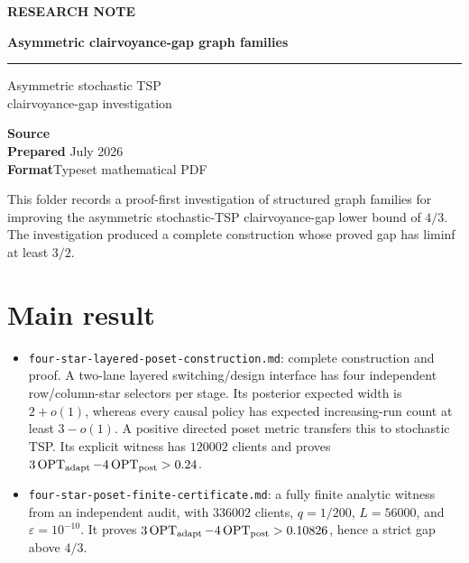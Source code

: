 \documentclass[11pt,a4paper]{article}
\begin{document}
\color{BodyGray}
\begin{titlepage}
  \thispagestyle{empty}
  \vspace*{22mm}
  {\sffamily\small\bfseries\color{Accent}\MakeUppercase{Research note}}\par
  \vspace{8mm}
  {\sffamily\fontsize{21}{25}\selectfont\bfseries\color{Navy} Asymmetric clairvoyance-gap graph families}\par
  \vspace{6mm}
  {\color{Accent}\rule{42mm}{1.4pt}}\par
  \vspace{11mm}
  {\Large\color{BodyGray} Asymmetric stochastic TSP\\
  clairvoyance-gap investigation}\par
  \vfill
  \begin{tcolorbox}[
    colback=SoftBlue,colframe=SoftBlue,arc=2pt,
    left=10pt,right=10pt,top=8pt,bottom=8pt]
    \sffamily
    \textbf{Source}\quad {}\\[3pt]
    \textbf{Prepared} July 2026\\[3pt]
    \textbf{Format}\quad Typeset mathematical PDF
  \end{tcolorbox}
  \vspace{12mm}
\end{titlepage}

This folder records a proof-first investigation of structured graph families for improving the asymmetric stochastic-TSP clairvoyance-gap lower bound of \(4/3\).  The investigation produced a complete construction whose proved gap has liminf at least \(3/2\).


\section*{Main result}

\begin{itemize}

\item \nolinkurl{four-star-layered-poset-construction.md}: complete construction and proof. A two-lane layered switching/design interface has four independent row/column-star selectors per stage.  Its posterior expected width is \(2+o(1)\), whereas every causal policy has expected increasing-run count at least \(3-o(1)\).  A positive directed poset metric transfers this to stochastic TSP.  Its explicit witness has \(120002\) clients and proves \(3\operatorname{OPT}_{\rm adapt} -4\operatorname{OPT}_{\rm post}>0.24\).

\item \nolinkurl{four-star-poset-finite-certificate.md}: a fully finite analytic witness from an independent audit, with \(336002\) clients, \(q=1/200\), \(L=56000\), and \(\varepsilon=10^{-10}\).  It proves \(3\operatorname{OPT}_{\rm adapt} -4\operatorname{OPT}_{\rm post}>0.10826\), hence a strict gap above \(4/3\).

\end{itemize}
\end{document}

